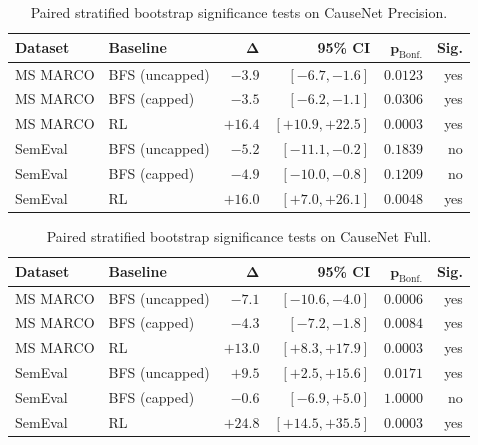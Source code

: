 \begin{table}[H]
\centering
\small
\setlength{\tabcolsep}{5pt}
\caption{Paired stratified bootstrap significance tests on CauseNet Precision.}
\label{tab:f1-significance-causenet-precision}
\begin{tabular}{@{}p{4.2cm}lrrrr@{}}
\toprule
\textbf{Dataset} & \textbf{Baseline} & $\boldsymbol{\Delta}$ & \textbf{95\% CI} & $\boldsymbol{p_{\mathrm{Bonf.}}}$ & \textbf{Sig.} \\
\midrule
MS MARCO & BFS (uncapped) & $-3.9$ & $[-6.7,-1.6]$ & $0.0123$ & yes \\
MS MARCO & BFS (capped)   & $-3.5$ & $[-6.2,-1.1]$ & $0.0306$ & yes \\
MS MARCO & RL             & $+16.4$ & $[+10.9,+22.5]$ & $0.0003$ & yes \\
SemEval  & BFS (uncapped) & $-5.2$ & $[-11.1,-0.2]$ & $0.1839$ & no \\
SemEval  & BFS (capped)   & $-4.9$ & $[-10.0,-0.8]$ & $0.1209$ & no \\
SemEval  & RL             & $+16.0$ & $[+7.0,+26.1]$ & $0.0048$ & yes \\
\bottomrule
\end{tabular}
\end{table}

\begin{table}[H]
\centering
\small
\setlength{\tabcolsep}{5pt}
\caption{Paired stratified bootstrap significance tests on CauseNet Full.}
\label{tab:f1-significance-causenet-full}
\begin{tabular}{@{}p{4cm}lrrrr@{}}
\toprule
\textbf{Dataset} & \textbf{Baseline} & $\boldsymbol{\Delta}$ & \textbf{95\% CI} & $\boldsymbol{p_{\mathrm{Bonf.}}}$ & \textbf{Sig.} \\
\midrule
MS MARCO & BFS (uncapped) & $-7.1$ & $[-10.6,-4.0]$ & $0.0006$ & yes \\
MS MARCO & BFS (capped)   & $-4.3$ & $[-7.2,-1.8]$ & $0.0084$ & yes \\
MS MARCO & RL             & $+13.0$ & $[+8.3,+17.9]$ & $0.0003$ & yes \\
SemEval  & BFS (uncapped) & $+9.5$ & $[+2.5,+15.6]$ & $0.0171$ & yes \\
SemEval  & BFS (capped)   & $-0.6$ & $[-6.9,+5.0]$ & $1.0000$ & no \\
SemEval  & RL             & $+24.8$ & $[+14.5,+35.5]$ & $0.0003$ & yes \\
\bottomrule
\end{tabular}
\end{table}

